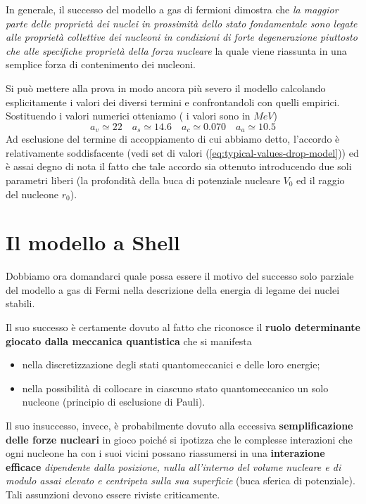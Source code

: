 In generale, il successo del modello a gas di fermioni dimostra che
\emph{la maggior parte delle proprietà dei nuclei in prossimità dello stato fondamentale sono legate alle proprietà
collettive dei nucleoni in condizioni di forte degenerazione piuttosto che alle specifiche proprietà della forza nucleare}
la quale viene riassunta in una semplice forza di contenimento dei nucleoni.

Si può mettere alla prova in modo ancora più severo il modello calcolando esplicitamente i valori dei diversi termini e confrontandoli con quelli empirici.
Sostituendo i valori numerici otteniamo ( i valori sono in $MeV$)
\[
	a_v \simeq 22 \quad
	a_s \simeq 14.6 \quad
	a_c \simeq 0.070 \quad
	a_a \simeq 10.5
\]
Ad esclusione del termine di accoppiamento di cui abbiamo detto, l’accordo è relativamente soddisfacente
(vedi set di valori (\ref{eq:typical-values-drop-model})) ed è assai degno di nota il fatto che tale accordo sia
ottenuto introducendo due soli parametri liberi (la profondità della buca di potenziale nucleare $V_0$
ed il raggio del nucleone $r_0$).
\section{Il modello a Shell}\label{sec:il-modello-a-shell}

Dobbiamo ora domandarci quale possa essere il motivo del successo solo parziale del modello a gas di Fermi nella descrizione della energia di legame dei nuclei stabili.

Il suo successo è certamente dovuto al fatto che riconosce il \textbf{ruolo determinante giocato dalla meccanica quantistica} che si manifesta
\begin{itemize}
	\item nella discretizzazione degli stati quantomeccanici e delle loro energie;
	\item nella possibilità di collocare in ciascuno stato quantomeccanico un solo nucleone (principio di esclusione di Pauli).
\end{itemize}

Il suo insuccesso, invece, è probabilmente dovuto alla eccessiva \textbf{semplificazione delle forze nucleari} in gioco poiché si ipotizza che le complesse interazioni che ogni nucleone ha con i suoi vicini possano riassumersi in una \textbf{interazione efficace} \emph{dipendente dalla posizione, nulla all’interno del volume nucleare e di modulo assai elevato e centripeta sulla sua superficie} (buca sferica di potenziale). Tali assunzioni devono essere riviste criticamente.

